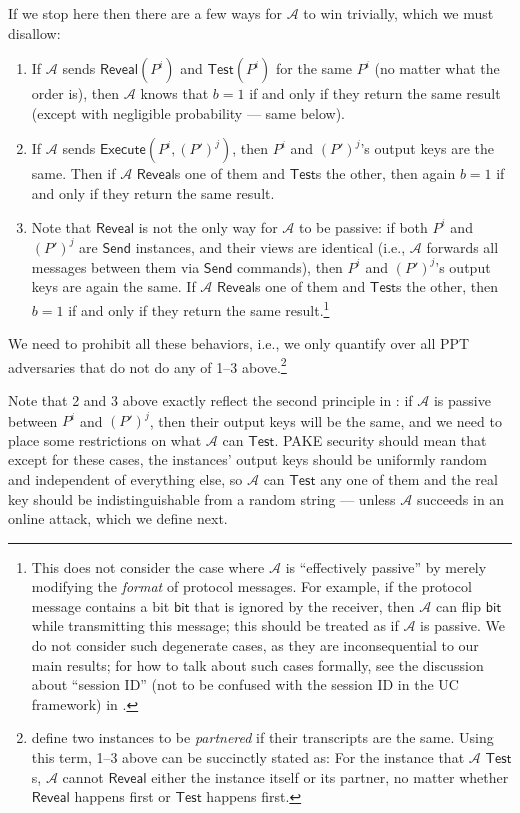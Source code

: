 \documentclass{article}
\newcommand{\adv}{\mathcal{A}}
\newcommand{\Execute}{\mathsf{Execute}}
\newcommand{\Send}{\mathsf{Send}}
\newcommand{\Reveal}{\mathsf{Reveal}}
\newcommand{\Test}{\mathsf{Test}}
\begin{document}
If we stop here then there are a few ways for $\adv$ to win trivially, which we must disallow:
\begin{enumerate}
  \item If $\adv$ sends $\Reveal(P^i)$ and $\Test(P^i)$ for the same $P^i$ (no matter what the order is), then $\adv$ knows that $b = 1$ if and only if they return the same result (except with negligible probability --- same below).
  \item If $\adv$ sends $\Execute(P^i, (P')^j)$, then $P^i$ and $(P')^j$'s output keys are the same. Then if $\adv$ $\Reveal$s one of them and $\Test$s the other, then again $b = 1$ if and only if they return the same result.
  \item Note that $\Reveal$ is not the only way for $\adv$ to be passive: if both $P^i$ and $(P')^j$ are $\Send$ instances, and their views are identical (i.e., $\adv$ forwards all messages between them via $\Send$ commands), then $P^i$ and $(P')^j$'s output keys are again the same. If $\adv$ $\Reveal$s one of them and $\Test$s the other, then $b = 1$ if and only if they return the same result.\footnote{This does not consider the case where $\adv$ is ``effectively passive'' by merely modifying the \emph{format} of protocol messages. For example, if the protocol message contains a bit $\mathsf{bit}$ that is ignored by the receiver, then $\adv$ can flip $\mathsf{bit}$ while transmitting this message; this should be treated as if $\adv$ is passive. We do not consider such degenerate cases, as they are inconsequential to our main results; for how to talk about such cases formally, see the discussion about ``session ID'' (not to be confused with the session ID in the UC framework) in \cite{EC:BelPoiRog00,JACM:KatOstYun09}.}
\end{enumerate}
We need to prohibit all these behaviors, i.e., we only quantify over all PPT adversaries that do not do any of 1--3 above.\footnote{\cite{EC:BelPoiRog00,JACM:KatOstYun09} define two instances to be \emph{partnered} if their transcripts are the same. Using this term, 1--3 above can be succinctly stated as: For the instance that $\adv$ $\Test$s, $\adv$ cannot $\Reveal$ either the instance itself or its partner, no matter whether $\Reveal$ happens first or $\Test$ happens first.}

Note that 2 and 3 above exactly reflect the second principle in : if $\adv$ is passive between $P^i$ and $(P')^j$, then their output keys will be the same, and we need to place some restrictions on what $\adv$ can $\Test$. PAKE security should mean that except for these cases, the instances' output keys should be uniformly random and independent of everything else, so $\adv$ can $\Test$ any one of them and the real key should be indistinguishable from a random string --- unless $\adv$ succeeds in an online attack, which we define next.
\end{document}
